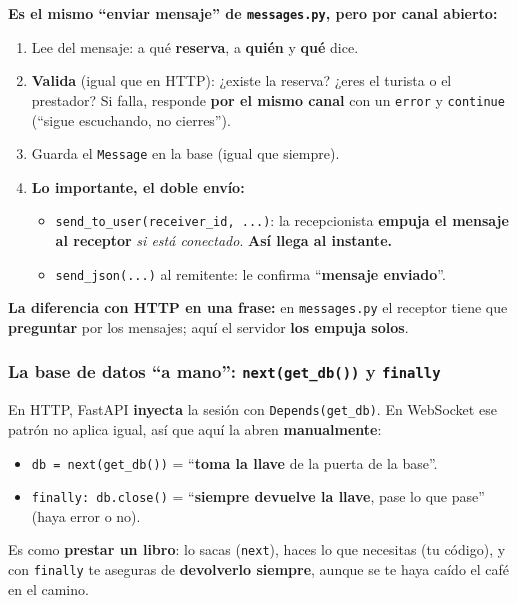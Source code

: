 \documentclass[11pt,a4paper]{article}
\begin{document}
\textbf{Es el mismo ``enviar mensaje'' de \texttt{messages.py}, pero por canal abierto:}
\begin{enumerate}
    \item Lee del mensaje: a qué \textbf{reserva}, a \textbf{quién} y \textbf{qué} dice.
    \item \textbf{Valida} (igual que en HTTP): ¿existe la reserva? ¿eres el turista o el
    prestador? Si falla, responde \textbf{por el mismo canal} con un \texttt{error} y
    \texttt{continue} (``sigue escuchando, no cierres'').
    \item Guarda el \texttt{Message} en la base (igual que siempre).
    \item \textbf{Lo importante, el doble envío:}
    \begin{itemize}
        \item \texttt{send\_to\_user(receiver\_id, ...)}: la recepcionista \textbf{empuja el
        mensaje al receptor} \emph{si está conectado}. \textbf{Así llega al instante.}
        \item \texttt{send\_json(...)} al remitente: le confirma ``\textbf{mensaje enviado}''.
    \end{itemize}
\end{enumerate}

\textbf{La diferencia con HTTP en una frase:} en \texttt{messages.py} el receptor tiene que
\textbf{preguntar} por los mensajes; aquí el servidor \textbf{los empuja solos}.

\subsubsection{La base de datos ``a mano'': \texttt{next(get\_db())} y \texttt{finally}}

En HTTP, FastAPI \textbf{inyecta} la sesión con \texttt{Depends(get\_db)}. En WebSocket ese
patrón no aplica igual, así que aquí la abren \textbf{manualmente}:
\begin{itemize}
    \item \texttt{db = next(get\_db())} = ``\textbf{toma la llave} de la puerta de la base''.
    \item \texttt{finally: db.close()} = ``\textbf{siempre devuelve la llave}, pase lo que
    pase'' (haya error o no).
\end{itemize}

\begin{analogia}
Es como \textbf{prestar un libro}: lo sacas (\texttt{next}), haces lo que necesitas (tu
código), y con \texttt{finally} te aseguras de \textbf{devolverlo siempre}, aunque se te haya
caído el café en el camino.
\end{analogia}
\end{document}
